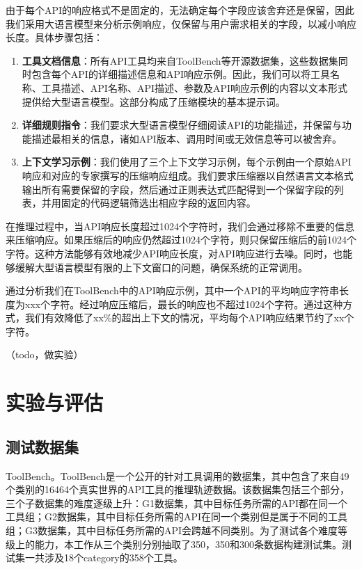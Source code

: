 由于每个API的响应格式不是固定的，无法确定每个字段应该舍弃还是保留，因此我们采用大语言模型来分析示例响应，仅保留与用户需求相关的字段，以减小响应长度。具体步骤包括：

\begin{enumerate}
    \item \textbf{工具文档信息}：所有API工具均来自ToolBench等开源数据集，这些数据集同时包含每个API的详细描述信息和API响应示例。因此，我们可以将工具名称、工具描述、API名称、API描述、参数及API响应示例的内容以文本形式提供给大型语言模型。这部分构成了压缩模块的基本提示词。
    
    \item \textbf{详细规则指令}：我们要求大型语言模型仔细阅读API的功能描述，并保留与功能描述最相关的信息，诸如API版本、调用时间或无效信息等可以被舍弃。
    
    \item \textbf{上下文学习示例}：我们使用了三个上下文学习示例，每个示例由一个原始API响应和对应的专家撰写的压缩响应组成。我们要求压缩器以自然语言文本格式输出所有需要保留的字段，然后通过正则表达式匹配得到一个保留字段的列表，并用固定的代码逻辑筛选出相应字段的返回内容。
\end{enumerate}

在推理过程中，当API响应长度超过1024个字符时，我们会通过移除不重要的信息来压缩响应。如果压缩后的响应仍然超过1024个字符，则只保留压缩后的前1024个字符。这种方法能够有效地减少API响应长度，对API响应进行去噪。同时，也能够缓解大型语言模型有限的上下文窗口的问题，确保系统的正常调用。

通过分析我们在ToolBench中的API响应示例，其中一个API的平均响应字符串长度为xxx个字符。经过响应压缩后，最长的响应也不超过1024个字符。通过这种方式，我们有效降低了xx\%的超出上下文的情况，平均每个API响应结果节约了xx个字符。

（todo，做实验）

\section{实验与评估}

\subsection{测试数据集}
\label{subsec:test_dataset}

ToolBench。ToolBench\cite{Qin2023}是一个公开的针对工具调用的数据集，其中包含了来自49个类别的16464个真实世界的API工具的推理轨迹数据。该数据集包括三个部分，三个子数据集的难度逐级上升：G1数据集，其中目标任务所需的API都在同一个工具组；G2数据集，其中目标任务所需的API在同一个类别但是属于不同的工具组；G3数据集，其中目标任务所需的API会跨越不同类别。为了测试各个难度等级上的能力，本工作从三个类别分别抽取了350，350和300条数据构建测试集。测试集一共涉及18个category的358个工具。

